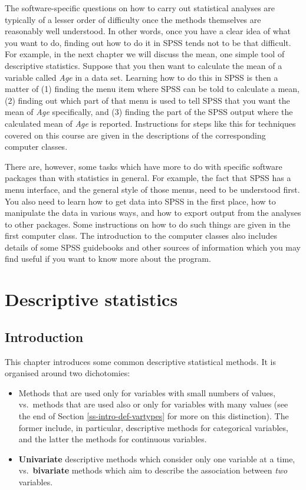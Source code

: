 \documentclass[11pt,a4paper,openany]{book}
\begin{document}
The software-specific questions on how to carry out statistical analyses
are typically of a lesser order of difficulty once the methods
themselves are reasonably well understood. In other words, once you have
a clear idea of what you want to do, finding out how to do it in SPSS
tends not to be that difficult. For example, in the next chapter we will
discuss the mean, one simple tool of descriptive statistics. Suppose
that you then want to calculate the mean of a variable called \emph{Age}
in a data set. Learning how to do this in SPSS is then a matter of (1)
finding the menu item where SPSS can be told to calculate a mean, (2)
finding out which part of that menu is used to tell SPSS that you want
the mean of \emph{Age} specifically, and (3) finding the part of the
SPSS output where the calculated mean of \emph{Age} is reported.
Instructions for steps like this for techniques covered on this course
are given in the descriptions of the corresponding computer classes.

There are, however, some tasks which have more to do with specific
software packages than with statistics in general. For example, the fact
that SPSS has a menu interface, and the general style of those menus,
need to be understood first. You also need to learn how to get data into
SPSS in the first place, how to manipulate the data in various ways, and
how to export output from the analyses to other packages. Some
instructions on how to do such things are given in the first computer
class. The introduction to the computer classes also includes details of
some SPSS guidebooks and other sources of information which you may find
useful if you want to know more about the program.

\chapter{Descriptive statistics}\label{c-descr1}

\section{Introduction}\label{s-descr1-intro}

This chapter introduces some common descriptive statistical methods. It
is organised around two dichotomies:

\begin{itemize}
\item
  Methods that are used only for variables with small numbers of values,
  vs.~methods that are used also or only for variables with many values
  (see the end of Section \ref{ss-intro-def-vartypes} for more on this
  distinction). The former include, in particular, descriptive methods
  for categorical variables, and the latter the methods for continuous
  variables.
\item
  \textbf{Univariate} descriptive methods which consider only one
  variable at a time, vs.~\textbf{bivariate} methods which aim to
  describe the association between \emph{two} variables.
\end{itemize}
\end{document}
